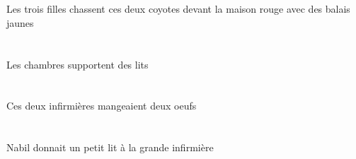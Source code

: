 \begin{exe}
\INDPlOblP{}   \jauneAPlP{}   \balaiAPlOblP{}   \AVECP{}   \DEFPlErgP{}   \troisCPlP{}   \filleCPlErgP{}   \DEMDuAbsP{}    \DEFSgOblP{}   \rougeDSgP{}   \maisonDSgOblP{}   \DEVANTP{}   \coyoteCDuAbsP{}  \chasserVtPrsCDuP{}\\
\INDPlOblG{}   \jauneAPlG{}   \balaiAPlOblG{}   \AVECG{}   \DEFPlErgG{}   \troisCPlG{}   \filleCPlErgG{}   \DEMDuAbsG{}    \DEFSgOblG{}   \rougeDSgG{}   \maisonDSgOblG{}   \DEVANTG{}   \coyoteCDuAbsG{}  \chasserVtPrsCDuG{}\\
Les trois filles chassent ces deux coyotes devant la maison rouge avec des balais jaunes
\ex\glll
\DEFPlErg{}   \chambreBPlErg{}   \INDPlAbs{}   \litDPlAbs{}  \supporterVtPrsDPl{}\\
\DEFPlErgP{}   \chambreBPlErgP{}   \INDPlAbsP{}   \litDPlAbsP{}  \supporterVtPrsDPlP{}\\
\DEFPlErgG{}   \chambreBPlErgG{}   \INDPlAbsG{}   \litDPlAbsG{}  \supporterVtPrsDPlG{}\\
Les chambres supportent des lits
\ex\glll
\DEMDuErg{}   \infirmiereADuErg{}   \INDDuAbs{}   \oeufCDuAbs{}  \mangerVtPstCDu{}\\
\DEMDuErgP{}   \infirmiereADuErgP{}   \INDDuAbsP{}   \oeufCDuAbsP{}  \mangerVtPstCDuP{}\\
\DEMDuErgG{}   \infirmiereADuErgG{}   \INDDuAbsG{}   \oeufCDuAbsG{}  \mangerVtPstCDuG{}\\
Ces deux infirmières mangeaient deux oeufs
\ex\glll
\INDSgErg{}   \NabilDSgErg{}    \DEFSgDat{}   \grandASg{}   \infirmiereASgDat{}   \INDSgAbs{}   \petitDSg{}   \litDSgAbs{}  \donnerVdPstDSg{}\\
\INDSgErgP{}   \NabilDSgErgP{}    \DEFSgDatP{}   \grandASgP{}   \infirmiereASgDatP{}   \INDSgAbsP{}   \petitDSgP{}   \litDSgAbsP{}  \donnerVdPstDSgP{}\\
\INDSgErgG{}   \NabilDSgErgG{}    \DEFSgDatG{}   \grandASgG{}   \infirmiereASgDatG{}   \INDSgAbsG{}   \petitDSgG{}   \litDSgAbsG{}  \donnerVdPstDSgG{}\\
Nabil donnait un petit lit à la grande infirmière
\ex\glll
\INDDuAbs{}   \cafeCDuAbs{}    \DEFPlObl{}    \DEFSgObl{}   \chambreBSgObl{}   \DE{}   \coussinBPlObl{}   \SUR{}  \tomberViPstCDu{}\\
\INDDuAbsP{}   \cafeCDuAbsP{}    \DEFPlOblP{}    \DEFSgOblP{}   \chambreBSgOblP{}   \DEP{}   \coussinBPlOblP{}   \SURP{}  \tomberViPstCDuP{}\\
\INDDuAbsG{}   \cafeCDuAbsG{}    \DEFPlOblG{}    \DEFSgOblG{}   \chambreBSgOblG{}   \DEG{}   \coussinBPlOblG{}   \SURG{}  \tomberViPstCDuG{}\\

\end{exe}
